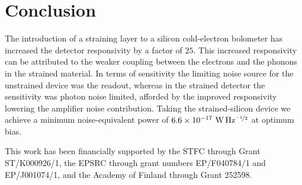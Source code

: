 \documentclass[final]{svjour2}
\begin{document}
\section{Conclusion}
The introduction of a straining layer to a silicon cold-electron bolometer has increased the detector responsivity by a factor of $25$. This increased responsivity can be attributed to the weaker coupling between the electrons and the phonons in the strained material. In terms of sensitivity the limiting noise source for the unstrained device was the readout, whereas in the strained detector the sensitivity was photon noise limited, afforded by the improved responsivity lowering the amplifier noise contribution. Taking the strained-silicon device we achieve a minimum noise-equivalent power of $6.6 \times 10^{-17}~\mathrm{W\,Hz^{\nicefrac{-1}{2}}}$ at optimum bias.
\begin{acknowledgements}
This work has been financially supported by the STFC through Grant ST/K000926/1, the EPSRC through grant numbers EP/F040784/1 and EP/J001074/1, and the Academy of Finland through Grant 252598.
\end{acknowledgements}
%
\end{document}
